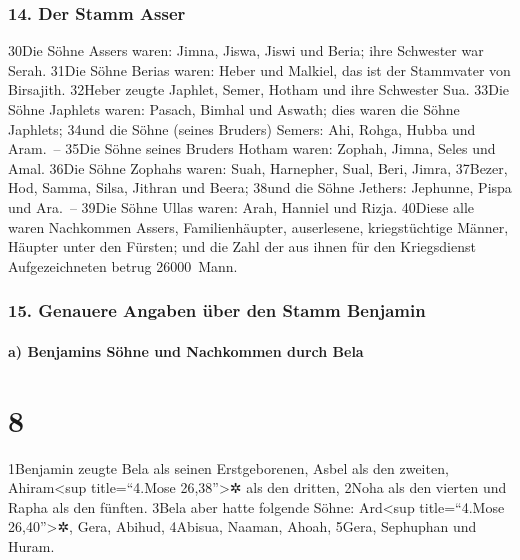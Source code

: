 \hypertarget{der-stamm-asser}{%
\subsubsection{14. Der Stamm Asser}\label{der-stamm-asser}}

30Die Söhne Assers waren: Jimna, Jiswa, Jiswi und Beria; ihre Schwester
war Serah. 31Die Söhne Berias waren: Heber und Malkiel, das ist der
Stammvater von Birsajith. 32Heber zeugte Japhlet, Semer, Hotham und ihre
Schwester Sua. 33Die Söhne Japhlets waren: Pasach, Bimhal und Aswath;
dies waren die Söhne Japhlets; 34und die Söhne (seines Bruders) Semers:
Ahi, Rohga, Hubba und Aram.~-- 35Die Söhne seines Bruders Hotham waren:
Zophah, Jimna, Seles und Amal. 36Die Söhne Zophahs waren: Suah,
Harnepher, Sual, Beri, Jimra, 37Bezer, Hod, Samma, Silsa, Jithran und
Beera; 38und die Söhne Jethers: Jephunne, Pispa und Ara.~-- 39Die Söhne
Ullas waren: Arah, Hanniel und Rizja. 40Diese alle waren Nachkommen
Assers, Familienhäupter, auserlesene, kriegstüchtige Männer, Häupter
unter den Fürsten; und die Zahl der aus ihnen für den Kriegsdienst
Aufgezeichneten betrug 26000~Mann.

\hypertarget{genauere-angaben-uxfcber-den-stamm-benjamin}{%
\subsubsection{15. Genauere Angaben über den Stamm
Benjamin}\label{genauere-angaben-uxfcber-den-stamm-benjamin}}

\hypertarget{a-benjamins-suxf6hne-und-nachkommen-durch-bela}{%
\paragraph{a) Benjamins Söhne und Nachkommen durch
Bela}\label{a-benjamins-suxf6hne-und-nachkommen-durch-bela}}

\hypertarget{section-7}{%
\section{8}\label{section-7}}

1Benjamin zeugte Bela als seinen Erstgeborenen, Asbel als den zweiten,
Ahiram\textless sup title=``4.Mose 26,38''\textgreater✲ als den dritten,
2Noha als den vierten und Rapha als den fünften. 3Bela aber hatte
folgende Söhne: Ard\textless sup title=``4.Mose 26,40''\textgreater✲,
Gera, Abihud, 4Abisua, Naaman, Ahoah, 5Gera, Sephuphan und Huram.


